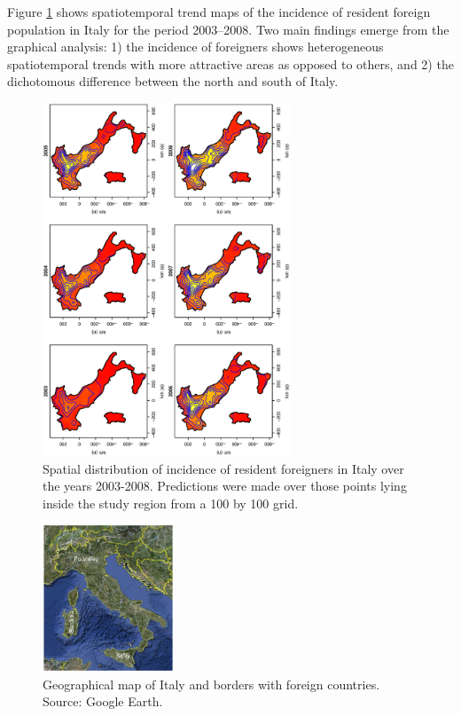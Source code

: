 \documentclass[10pt]{article}
\theoremstyle{definition}
\theoremstyle{plain}
\begin{document}
Figure \ref{fig2} shows spatiotemporal trend maps of the incidence of resident foreign population in Italy for the period 2003--2008. Two main findings emerge from the graphical analysis: 1) the incidence of foreigners shows heterogeneous spatiotemporal trends with more attractive areas as opposed to others, and 2) the dichotomous difference between the north and south of Italy.  

\begin{figure}[htbp]
	\centering
		\includegraphics[width=0.66\textwidth, angle=270]{SmoothPlot.eps}
	\caption{Spatial distribution of incidence of resident foreigners in Italy over the years 2003-2008. Predictions were made over those points lying inside the study region from a 100 by 100 grid.}
	\label{fig2}
\end{figure}


\begin{figure}[htbp]
	\centering
		\includegraphics[width=0.35\textwidth]{mapIT.eps}
	\caption{Geographical map of Italy and borders with foreign countries. Source: Google Earth.}
	\label{fig1}
\end{figure}
\end{document}
